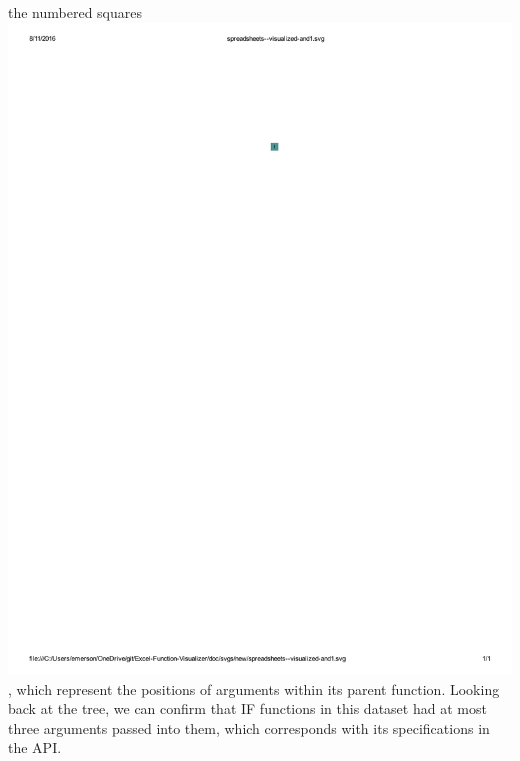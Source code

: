 \documentclass[conference]{IEEEtran}
\begin{document}
	the numbered squares \includegraphics{glossary-blue}, which represent the
	positions of arguments within its parent function. Looking back at the tree, we
	can confirm that IF functions in this dataset had at most three arguments
	passed into them, which corresponds with its specifications in the API. 
	
\end{document}
